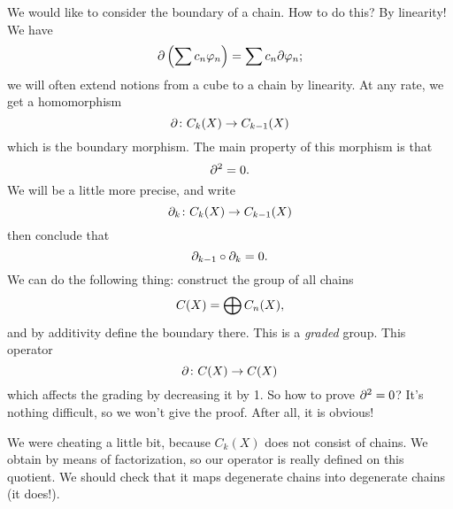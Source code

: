 We would like to consider the boundary of a chain. How to do
this? By linearity! We have
\begin{equation}
\partial\left(\sum c_{n}\varphi_{n}\right)=\sum
c_{n}\partial\varphi_{n};
\end{equation}
we will often extend notions from a cube to a chain by
linearity. At any rate, we get a homomorphism
\begin{equation}\index{$\bdry$}
\bdry\colon C_{k}(X)\to C_{k-1}(X)
\end{equation}
which is the boundary morphism.
The main property of this morphism is that
\begin{equation}
\partial^2=0.
\end{equation}
We will be a little more precise, and write
\begin{equation}
\partial_k\colon C_{k}(X)\to C_{k-1}(X)
\end{equation}
then conclude that
\begin{equation}\index{$\bdry^2=0$}
\bdry_{k-1}\circ\bdry_{k}=0.
\end{equation}
We can do the following thing: construct the group of all chains
\begin{equation}\index{$C(X)$}
C(X)=\bigoplus C_{n}(X),
\end{equation}
and by additivity define the boundary there.
This is a \emph{graded} group. This operator
\begin{equation}
\partial\colon C(X)\to C(X)
\end{equation}
which affects the grading by decreasing it by 1. So how to prove
$\partial^2=0$? It's nothing difficult, so we won't give the
proof. After all, it is obvious!

We were cheating a little bit, because $C_{k}(X)$ does not
consist of chains. We obtain by means of factorization, so our
operator is really defined on this quotient. We should check that
it maps degenerate chains into degenerate chains (it does!).

